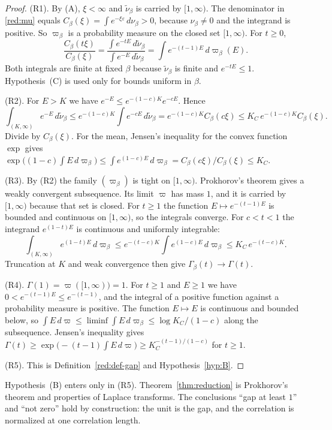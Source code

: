 \begin{proof}
(R1). By (A), $\xi<\infty$ and $\tilde\nu_\beta$ is carried by $[1,\infty)$. The denominator in \eqref{red:mu} equals $C_\beta(\xi)=\int e^{-\xi\varepsilon}\,d\nu_\beta>0$, because $\nu_\beta\ne0$ and the integrand is positive. So $\varpi_\beta$ is a probability measure on the closed set $[1,\infty)$. For $t\ge0$,
\[
  \frac{C_\beta(t\xi)}{C_\beta(\xi)}=\frac{\int e^{-tE}\,d\tilde\nu_\beta}{\int e^{-E}\,d\tilde\nu_\beta}=\int e^{-(t-1)E}\,d\varpi_\beta(E).
\]
Both integrals are finite at fixed $\beta$ because $\tilde\nu_\beta$ is finite and $e^{-tE}\le1$. Hypothesis~(C) is used only for bounds uniform in $\beta$.

(R2). For $E>K$ we have $e^{-E}\le e^{-(1-c)K}e^{-cE}$. Hence
\[
  \int_{(K,\infty)}e^{-E}\,d\tilde\nu_\beta\le e^{-(1-c)K}\int e^{-cE}\,d\tilde\nu_\beta=e^{-(1-c)K}C_\beta(c\xi)\le K_C\,e^{-(1-c)K}C_\beta(\xi).
\]
Divide by $C_\beta(\xi)$. For the mean, Jensen's inequality for the convex function $\exp$ gives $\exp\bigl((1-c)\int E\,d\varpi_\beta\bigr)\le\int e^{(1-c)E}\,d\varpi_\beta=C_\beta(c\xi)/C_\beta(\xi)\le K_C$.

(R3). By (R2) the family $(\varpi_\beta)$ is tight on $[1,\infty)$. Prokhorov's theorem gives a weakly convergent subsequence. Its limit $\varpi$ has mass $1$, and it is carried by $[1,\infty)$ because that set is closed. For $t\ge1$ the function $E\mapsto e^{-(t-1)E}$ is bounded and continuous on $[1,\infty)$, so the integrals converge. For $c<t<1$ the integrand $e^{(1-t)E}$ is continuous and uniformly integrable:
\[
  \int_{(K,\infty)}e^{(1-t)E}\,d\varpi_\beta\le e^{-(t-c)K}\int e^{(1-c)E}\,d\varpi_\beta\le K_C\,e^{-(t-c)K}.
\]
Truncation at $K$ and weak convergence then give $\Gamma_\beta(t)\to \Gamma(t)$.

(R4). $\Gamma(1)=\varpi([1,\infty))=1$. For $t\ge1$ and $E\ge1$ we have $0<e^{-(t-1)E}\le e^{-(t-1)}$, and the integral of a positive function against a probability measure is positive. The function $E\mapsto E$ is continuous and bounded below, so $\int E\,d\varpi\le\liminf\int E\,d\varpi_\beta\le\log K_C/(1-c)$ along the subsequence. Jensen's inequality gives $\Gamma(t)\ge\exp\bigl(-(t-1)\int E\,d\varpi\bigr)\ge K_C^{-(t-1)/(1-c)}$ for $t\ge1$.

(R5). This is Definition~\ref{red:def-gap} and Hypothesis~\ref{hyp:B}.
\end{proof}

Hypothesis~(B) enters only in (R5). Theorem~\ref{thm:reduction} is Prokhorov's theorem and properties of Laplace transforms. The conclusions ``gap at least $1$'' and ``not zero'' hold by construction: the unit is the gap, and the correlation is normalized at one correlation length.

